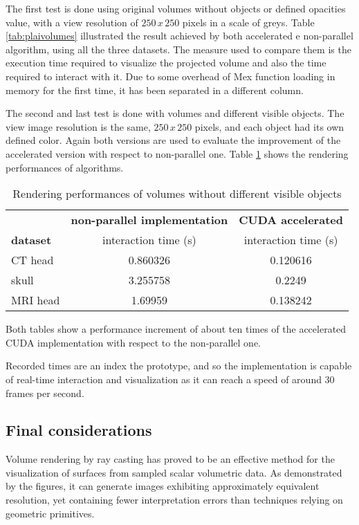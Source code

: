 \documentclass[12pt,a4paper]{extarticle}
\newcommand{\linespace}{\vspace{0pt}}
\begin{document}
The first test is done using original volumes without objects or defined opacities value, with a view resolution of $250\,x\,250$ pixels in a scale of greys. Table \ref{tab:plaivolumes} illustrated the result achieved by both accelerated e non-parallel algorithm, using all the three datasets. The measure used to compare them is the execution time required to visualize the projected volume and also the time required to interact with it. Due to some overhead of Mex function loading in memory for the first time, it has been separated in a different column.
\linespace

The second and last test is done with volumes and different visible objects. The view image resolution is the same, $250\,x\,250$ pixels, and each object had its own defined color. Again both versions are used to evaluate the improvement of the accelerated version with respect to non-parallel one.
Table \ref{tab:objsvolumes} shows the rendering performances of algorithms.

\begin{table}[hbtp]
\centering
\begin{tabular}{l|cc}
                 & \multicolumn{1}{c|}{\textbf{non-parallel implementation}} & \textbf{CUDA accelerated} \\ \cline{2-3} 
\textbf{dataset} & \multicolumn{1}{c|}{interaction time (s)}                 & interaction time (s)      \\ \hline
CT head          & 0.860326                                                  & 0.120616                  \\
skull            & 3.255758                                                  & 0.2249                    \\
MRI head         & 1.69959                                                   & 0.138242                 
\end{tabular}
\caption{Rendering performances of volumes without different visible objects}
\label{tab:objsvolumes}
\end{table}

Both tables show a performance increment of about ten times of the accelerated CUDA implementation with respect to the non-parallel one.

Recorded times are an index the prototype, and so the implementation is capable of real-time interaction and visualization as it can reach a speed of around 30 frames per second.

\subsection{Final considerations} 
Volume rendering by ray casting has proved to be an effective method for the visualization of surfaces from sampled scalar volumetric data. As demonstrated by the figures, it can generate images exhibiting approximately equivalent resolution, yet containing fewer interpretation errors than techniques relying on geometric primitives.
\linespace
\end{document}
